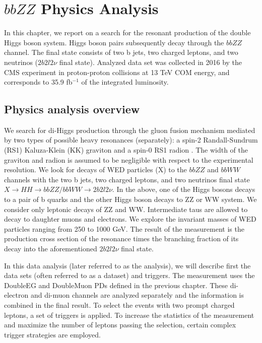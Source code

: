 \chapter{$bbZZ$ Physics Analysis}

\begin{small}

In this chapter, we report on a search for the resonant production of the double Higgs boson system. Higgs boson pairs subsequently decay through the $bbZZ$ channel. The final state consists of two b jets, two charged leptons, and two neutrinos ($2 b 2 l 2 \nu$ final state). Analyzed data set was collected in 2016 by the CMS experiment in proton-proton collisions at 13  TeV COM energy, and corresponds to 35.9 fb$^{-1}$ of the integrated luminosity.  

\section{Physics analysis overview}
\label{sec:an_overview}

We search for di-Higgs production through the gluon fusion mechanism mediated by two types of possible heavy resonances (separately): a spin-2 Randall-Sundrum (RS1) Kaluza-Klein (KK) graviton and a spin-0 RS1 radion \cite{WED, Xanda}. The width of the graviton and radion is assumed to be negligible with respect to the experimental resolution. We look for decays of WED particles (X) to the $bbZZ$ and $bbWW$ channels with the two b jets, two charged leptons, and two neutrinos final state $X \rightarrow HH \rightarrow bbZZ/bbWW \rightarrow 2 b 2l 2 \nu$. In the above, one of the Higgs bosons decays to a pair of b quarks and the other Higgs boson decays to ZZ or WW system. We consider only leptonic decays of ZZ and WW. Intermediate taus are allowed to decay to daughter muons and electrons.  We explore the invariant masses of WED particles ranging from 250 to 1000  GeV. The result of the measurement is the production cross section of the resonance times the branching fraction of its decay into the aforementioned $2 b 2 l 2 \nu$ final state. 

In this data analysis (later referred to as the analysis), we will describe first the data sets (often referred to as a dataset) and triggers. The measurement uses the DoubleEG and DoubleMuon PDs defined in the previous chapter. These di-electron and di-muon channels are analyzed separately and the information is combined in the final result. To select the events with two prompt charged leptons, a set of triggers is applied. To increase the statistics of the measurement and maximize the number of leptons passing the selection, certain complex trigger strategies are employed. 


\end{small}
